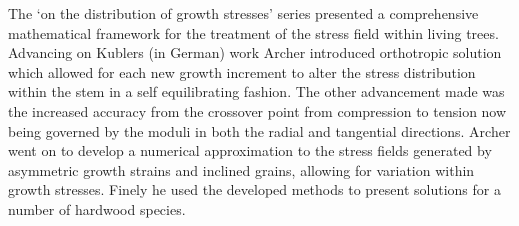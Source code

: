 The `on the distribution of growth stresses' series presented a comprehensive
mathematical framework for the treatment of the stress field within living
trees. Advancing on Kublers \cite{kubler1959a}\cite{kubler1959b} (in German) work Archer introduced orthotropic solution which
allowed for each new growth increment to alter the stress distribution within
the stem in a self equilibrating fashion. The other advancement made was the
increased accuracy from the crossover point from compression to tension now being
governed by the moduli in both the radial and tangential directions.
Archer went on to develop a numerical approximation to the stress fields
generated by asymmetric growth strains and inclined grains, allowing for
variation within growth stresses. Finely he used the developed methods to
present solutions for a number of hardwood species.